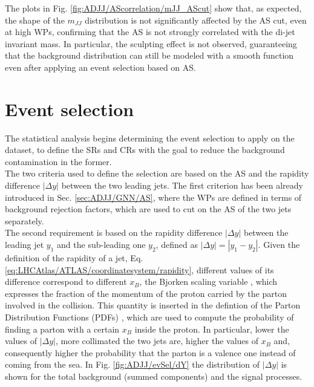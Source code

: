 \noindent The plots in Fig. \ref{fig:ADJJ/AScorrelation/mJJ_AScut} show that, as expected, the shape of the $m_{JJ}$ distribution is not significantly affected by the AS cut, even at high WPs, confirming that the AS is not strongly correlated with the di-jet invariant mass.
In particular, the sculpting effect is not observed, guaranteeing that the background distribution can still be modeled with a smooth function even after applying an event selection based on AS.\\


\section{Event selection}\label{sec:ADJJ/evSel}

The statistical analysis begins determining the event selection to apply on the dataset, to define the SRs and CRs with the goal to reduce the background contamination in the former.\\
The two criteria used to define the selection are based on the AS and the rapidity difference $|\Delta y|$ between the two leading jets.
The first criterion has been already introduced in Sec. \ref{sec:ADJJ/GNN/AS}, where the WPs are defined in terms of background rejection factors, which are used to cut on the AS of the two jets separately.\\
The second requirement is based on the rapidity difference $|\Delta y|$ between the leading jet $y_1$ and the sub-leading one $y_2$, defined as $|\Delta y| = |y_1 - y_2|$.
Given the definition of the rapidity of a jet, Eq. \ref{eq:LHCAtlas/ATLAS/coordinatesystem/rapidity}, different values of its difference correspond to different $x_B$, the Bjorken scaling variable \cite{Bjorken_x}, which expresses the fraction of the momentum of the proton carried by the parton involved in the collision.
This quantity is inserted in the defintion of the Parton Distribution Functions (PDFs) \cite{PDFs}, which are used to compute the probability of finding a parton with a certain $x_B$ inside the proton.
In particular, lower the values of $|\Delta y|$, more collimated the two jets are, higher the values of $x_B$ and, consequently higher the probability that the parton is a valence one instead of coming from the sea.
In Fig. \ref{fig:ADJJ/evSel/dY} the distribution of $|\Delta y|$ is shown for the total background (summed components) and the signal processes.

